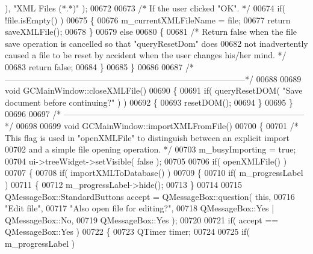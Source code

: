 \begin{DoxyCode}
{{{{      ), \textcolor{stringliteral}{"XML Files (*.*)"} );
00672 
00673   \textcolor{comment}{/* If the user clicked "OK". */}
00674   \textcolor{keywordflow}{if}( !file.isEmpty() )
00675   \{
00676     m\_currentXMLFileName = file;
00677     \textcolor{keywordflow}{return} saveXMLFile();
00678   \}
00679   \textcolor{keywordflow}{else}
00680   \{
00681     \textcolor{comment}{/* Return false when the file save operation is cancelled so that
       "queryResetDom" does}
00682 \textcolor{comment}{      not inadvertently caused a file to be reset by accident when the user
       changes his/her mind. */}
00683     \textcolor{keywordflow}{return} \textcolor{keyword}{false};
00684   \}
00685 \}
00686 
00687 \textcolor{comment}{/*
      --------------------------------------------------------------------------------------*/}
00688 
00689 \textcolor{keywordtype}{void} GCMainWindow::closeXMLFile()
00690 \{
00691   \textcolor{keywordflow}{if}( queryResetDOM( \textcolor{stringliteral}{"Save document before continuing?"} ) )
00692   \{
00693     resetDOM();
00694   \}
00695 \}
00696 
00697 \textcolor{comment}{/*
      --------------------------------------------------------------------------------------*/}
00698 
00699 \textcolor{keywordtype}{void} GCMainWindow::importXMLFromFile()
00700 \{
00701   \textcolor{comment}{/* This flag is used in "openXMLFile" to distinguish between an explicit
       import}
00702 \textcolor{comment}{    and a simple file opening operation. */}
00703   m\_busyImporting = \textcolor{keyword}{true};
00704   ui->treeWidget->setVisible( \textcolor{keyword}{false} );
00705 
00706   \textcolor{keywordflow}{if}( openXMLFile() )
00707   \{
00708     \textcolor{keywordflow}{if}( importXMLToDatabase() )
00709     \{
00710       \textcolor{keywordflow}{if}( m\_progressLabel )
00711       \{
00712         m\_progressLabel->hide();
00713       \}
00714 
00715       QMessageBox::StandardButtons accept = QMessageBox::question( \textcolor{keyword}{this},
00716                                                                    \textcolor{stringliteral}{"Edit file"},
00717                                                                    \textcolor{stringliteral}{"Also open
       file for editing?"},
00718                                                                    
      QMessageBox::Yes | QMessageBox::No,
00719                                                                    
      QMessageBox::Yes );
00720 
00721       \textcolor{keywordflow}{if}( accept == QMessageBox::Yes )
00722       \{
00723         QTimer timer;
00724 
00725         \textcolor{keywordflow}{if}( m\_progressLabel )
}}}}
\end{DoxyCode}
